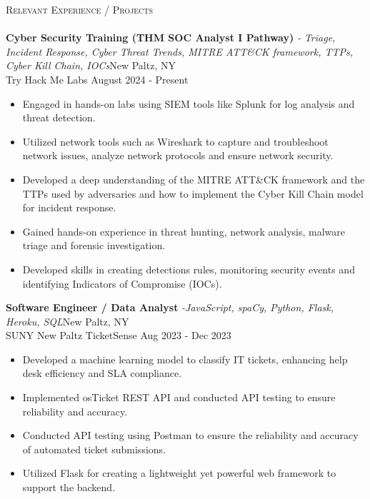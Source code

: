 \documentclass[a4paper]{article}
\newcommand{\lineunder} {
    \vspace*{-8pt} \\
    \hspace*{-18pt} \hrulefill \\
}
\newcommand{\header} [1] {
    {\hspace*{-18pt}\vspace*{5.5pt} \textsc{#1}}
    \vspace*{-6pt} \lineunder
}
\begin{document}
\header{Relevant Experience / Projects}




\textbf{Cyber Security Training (THM SOC Analyst I Pathway)} \hspace{-1mm} {\sl - Triage, Incident Response, Cyber Threat Trends, MITRE ATT\&CK framework, TTPs, Cyber Kill Chain, IOCs}\hfill New Paltz, NY\\
Try Hack Me Labs \hfill August 2024 - Present\\
\vspace{-2mm}
\begin{itemize}[leftmargin=0.5cm]
\setlength\itemsep{-2mm}
    \item Engaged in hands-on labs using SIEM tools like Splunk for log analysis and threat detection.
    \item Utilized network tools such as Wireshark to capture and troubleshoot network issues, analyze network protocols and ensure network security.
    \item Developed a deep understanding of the MITRE ATT\&CK framework and the TTPs used by adversaries and how to implement the Cyber Kill Chain model for incident response.
    \item Gained hands-on experience in threat hunting, network analysis, malware triage and forensic investigation. 
    \item Developed skills in creating detections rules, monitoring security events and identifying Indicators of Compromise (IOCs).
\end{itemize}


\textbf{Software Engineer / Data Analyst} \hspace{-1mm} {\sl -JavaScript, spaCy, Python, Flask, Heroku, SQL}\hfill New Paltz, NY\\
SUNY New Paltz TicketSense \hfill Aug 2023 - Dec 2023\\
\vspace{-2mm}
\begin{itemize}[leftmargin=0.5cm]
\setlength\itemsep{-2mm}
    \item Developed a machine learning model to classify IT tickets, enhancing help desk efficiency and SLA compliance.
    \item Implemented osTicket REST API and conducted API testing to ensure reliability and accuracy.
    \item Conducted API testing using Postman to ensure the reliability and accuracy of automated ticket submissions.
    \item Utilized Flask for creating a lightweight yet powerful web framework to support the backend.
\end{itemize}
\end{document}
